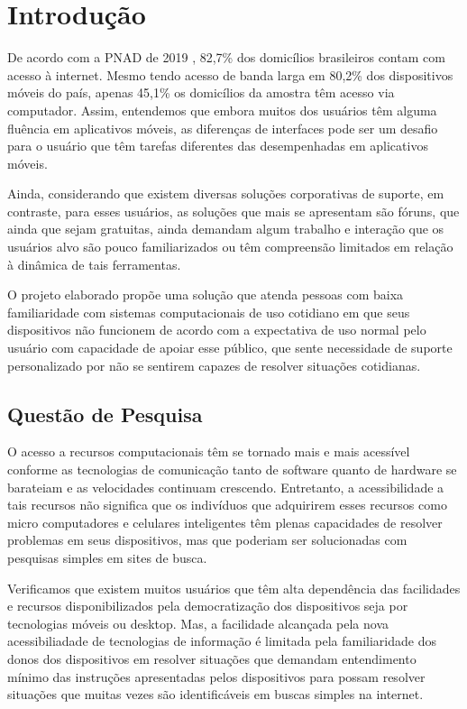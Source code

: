 
\chapter[Introdução]{Introdução}

	De acordo com a PNAD de 2019 \citeauthor{PNAD:2019}, 82,7\% dos domicílios brasileiros contam com acesso à internet. Mesmo tendo acesso de banda larga em 80,2\% dos dispositivos móveis do país, apenas 45,1\% os domicílios da amostra têm acesso via computador. Assim, entendemos que embora muitos dos usuários têm alguma fluência em aplicativos móveis, as diferenças de interfaces pode ser um desafio para o usuário que têm tarefas diferentes das desempenhadas em aplicativos móveis.
	
	Ainda, considerando que existem diversas soluções corporativas de suporte, em contraste, para esses usuários, as soluções que mais se apresentam são fóruns, que ainda que sejam gratuitas, ainda demandam algum trabalho e interação que os usuários alvo são pouco familiarizados ou têm compreensão limitados em relação à dinâmica de tais ferramentas.
		
	O projeto elaborado propõe uma solução que atenda pessoas com baixa familiaridade com sistemas computacionais de uso cotidiano em que seus dispositivos não funcionem de acordo com a expectativa de uso normal pelo usuário com capacidade de apoiar esse público, que sente necessidade de suporte personalizado por não se sentirem capazes de resolver situações cotidianas.

	\section[Questão de Pesquisa]{Questão de Pesquisa}
	
		O acesso a recursos computacionais têm se tornado mais e mais acessível conforme as tecnologias de comunicação tanto de software quanto de hardware se barateiam e as velocidades continuam crescendo. Entretanto, a acessibilidade a tais recursos não significa que os indivíduos que adquirirem esses recursos como micro computadores e celulares inteligentes têm plenas capacidades de resolver problemas em seus dispositivos, mas que poderiam ser solucionadas com pesquisas simples em sites de busca.
		
		Verificamos que existem muitos usuários que têm alta dependência das facilidades e recursos disponibilizados pela democratização dos dispositivos seja por tecnologias móveis ou desktop. Mas, a facilidade alcançada pela nova acessibiliadade de tecnologias de informação é limitada pela familiaridade dos donos dos dispositivos em resolver situações que demandam entendimento mínimo das instruções apresentadas pelos dispositivos para possam resolver situações que muitas vezes são identificáveis em buscas simples na internet.
		
